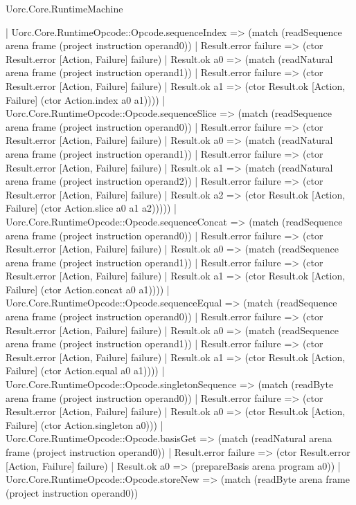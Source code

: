 \begin{lexlean}{Uorc.Core.RuntimeMachine}
\begin{semanticmodule}
{    | Uorc.Core.RuntimeOpcode::Opcode.sequenceIndex => (match (readSequence arena frame (project instruction operand0))
      | Result.error failure => (ctor Result.error [Action, Failure] failure)
      | Result.ok a0 => (match (readNatural arena frame (project instruction operand1))
        | Result.error failure => (ctor Result.error [Action, Failure] failure)
        | Result.ok a1 => (ctor Result.ok [Action, Failure] (ctor Action.index a0 a1))))
    | Uorc.Core.RuntimeOpcode::Opcode.sequenceSlice => (match (readSequence arena frame (project instruction operand0))
      | Result.error failure => (ctor Result.error [Action, Failure] failure)
      | Result.ok a0 => (match (readNatural arena frame (project instruction operand1))
        | Result.error failure => (ctor Result.error [Action, Failure] failure)
        | Result.ok a1 => (match (readNatural arena frame (project instruction operand2))
          | Result.error failure => (ctor Result.error [Action, Failure] failure)
          | Result.ok a2 => (ctor Result.ok [Action, Failure] (ctor Action.slice a0 a1 a2)))))
    | Uorc.Core.RuntimeOpcode::Opcode.sequenceConcat => (match (readSequence arena frame (project instruction operand0))
      | Result.error failure => (ctor Result.error [Action, Failure] failure)
      | Result.ok a0 => (match (readSequence arena frame (project instruction operand1))
        | Result.error failure => (ctor Result.error [Action, Failure] failure)
        | Result.ok a1 => (ctor Result.ok [Action, Failure] (ctor Action.concat a0 a1))))
    | Uorc.Core.RuntimeOpcode::Opcode.sequenceEqual => (match (readSequence arena frame (project instruction operand0))
      | Result.error failure => (ctor Result.error [Action, Failure] failure)
      | Result.ok a0 => (match (readSequence arena frame (project instruction operand1))
        | Result.error failure => (ctor Result.error [Action, Failure] failure)
        | Result.ok a1 => (ctor Result.ok [Action, Failure] (ctor Action.equal a0 a1))))
    | Uorc.Core.RuntimeOpcode::Opcode.singletonSequence => (match (readByte arena frame (project instruction operand0))
      | Result.error failure => (ctor Result.error [Action, Failure] failure)
      | Result.ok a0 => (ctor Result.ok [Action, Failure] (ctor Action.singleton a0)))
    | Uorc.Core.RuntimeOpcode::Opcode.basisGet => (match (readNatural arena frame (project instruction operand0))
      | Result.error failure => (ctor Result.error [Action, Failure] failure)
      | Result.ok a0 => (prepareBasis arena program a0))
    | Uorc.Core.RuntimeOpcode::Opcode.storeNew => (match (readByte arena frame (project instruction operand0))
}
\end{semanticmodule}
\end{lexlean}
